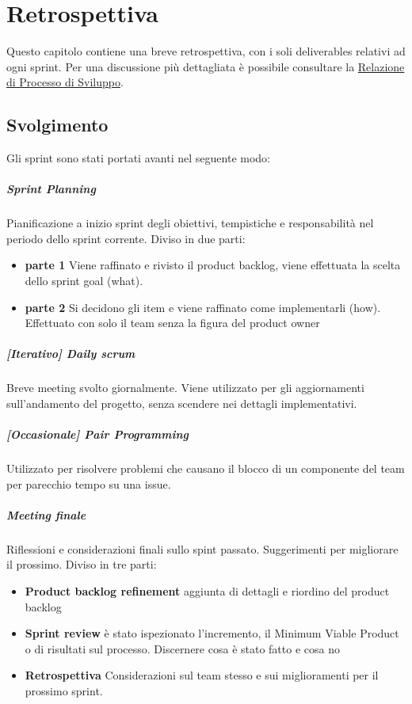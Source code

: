 \chapter{Retrospettiva}
\label{chap:Retrospettiva}
Questo capitolo contiene una breve retrospettiva, con i soli deliverables relativi ad ogni sprint. Per una discussione più dettagliata è possibile consultare la \href{https://github.com/ISIQuiz/ISIQuiz-Report/releases/latest/download/process.pdf}{Relazione di Processo di Sviluppo}.
\section{Svolgimento}
Gli sprint sono stati portati avanti nel seguente modo:
    \paragraph{Sprint Planning}
        Pianificazione a inizio sprint degli obiettivi, tempistiche e responsabilità nel periodo dello sprint corrente. Diviso in due parti:
        \begin{itemize}
        \item\textbf{parte 1} 
            Viene raffinato e rivisto il product backlog, viene effettuata la scelta dello sprint goal (what).
        \item\textbf{parte 2}
            Si decidono gli item e viene raffinato come implementarli (how). Effettuato con solo il team senza la figura del product owner
        \end{itemize}
    \paragraph{[Iterativo] Daily scrum} Breve meeting svolto giornalmente. Viene utilizzato per gli aggiornamenti sull'andamento del progetto, senza scendere nei dettagli implementativi.
    \paragraph{[Occasionale] Pair Programming } Utilizzato per risolvere problemi che causano il blocco di un componente del team per parecchio tempo su una issue.
    \paragraph{Meeting finale}
        Riflessioni e considerazioni finali sullo spint passato. Suggerimenti per migliorare il prossimo. Diviso in tre parti: 
        \begin{itemize}
        \item\textbf{Product backlog refinement} aggiunta di dettagli e riordino del product backlog
        \item\textbf{Sprint review} è stato ispezionato l'incremento, il Minimum Viable Product o di risultati sul processo. Discernere cosa è stato fatto e cosa no
        \item\textbf{Retrospettiva} Considerazioni sul team stesso e sui miglioramenti per il prossimo sprint. 
        \end{itemize}

